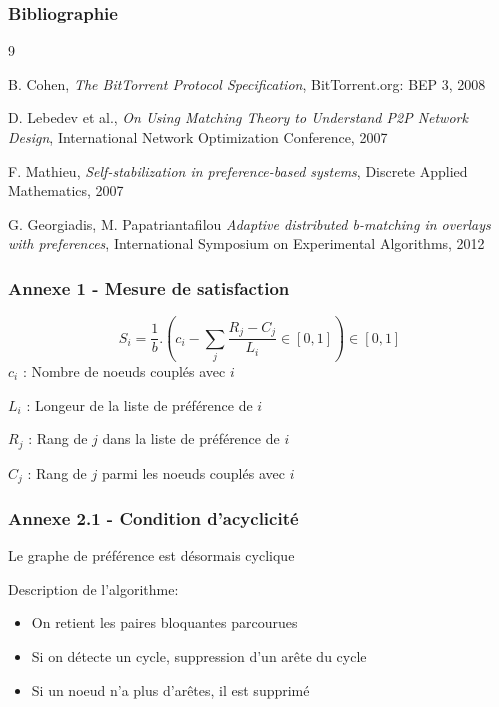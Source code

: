 \documentclass[aspectratio=43]{beamer}
\begin{document}
\begin{frame}
    \frametitle{Bibliographie}

    \begin{thebibliography}{9}

         B. Cohen,
        \textit{The BitTorrent Protocol Specification},
        BitTorrent.org: BEP 3, 2008


        D. Lebedev et al.,
        \textit{On Using Matching Theory to Understand P2P Network Design},
        International Network Optimization Conference, 2007


        F. Mathieu,
        \textit{Self-stabilization in preference-based systems},
        Discrete Applied Mathematics, 2007

        G. Georgiadis, M. Papatriantafilou
        \textit{Adaptive distributed b-matching in overlays with preferences},
        International Symposium on Experimental Algorithms, 2012

    \end{thebibliography}

\end{frame}

\begin{frame}
    \frametitle{Annexe 1 - Mesure de satisfaction}
    \begin{equation}
        S_i = \frac{1}{b} . (c_i - \sum_{j}{\frac{R_j - C_j}{L_i} \in [0, 1]}) \in [0, 1]
    \end{equation}
    $c_i$ : Nombre de noeuds couplés avec $i$

    $L_i$ : Longeur de la liste de préférence de $i$

    $R_j$ : Rang de $j$ dans la liste de préférence de $i$ 

    $C_j$ : Rang de $j$ parmi les noeuds couplés avec $i$
\end{frame}


\begin{frame}
    \frametitle{Annexe 2.1 - Condition d'acyclicité}
    Le graphe de préférence est désormais cyclique

    Description de l'algorithme:
    \begin{itemize}
        \item On retient les paires bloquantes parcourues
        \item Si on détecte un cycle, suppression d'un arête du cycle
        \item Si un noeud n'a plus d'arêtes, il est supprimé
    \end{itemize}
\end{frame}
\end{document}
